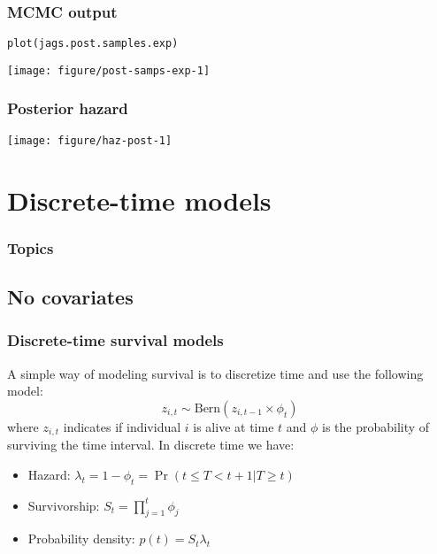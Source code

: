 \documentclass[color=usenames,dvipsnames]{beamer}\usepackage[]{graphicx}\usepackage[]{color}
\makeatletter
\newcommand{\hlstd}[1]{\textcolor[rgb]{0,0,0}{#1}}%
\newcommand{\hlkwd}[1]{\textcolor[rgb]{0.004,0.004,0.506}{#1}}%
\newenvironment{kframe}{%
 \def\at@end@of@kframe{}%
 \ifinner\ifhmode%
  \def\at@end@of@kframe{\end{minipage}}%
  \begin{minipage}{\columnwidth}%
 \fi\fi%
 \def\FrameCommand##1{\hskip\@totalleftmargin \hskip-\fboxsep
 \colorbox{shadecolor}{##1}\hskip-\fboxsep
     \hskip-\linewidth \hskip-\@totalleftmargin \hskip\columnwidth}%
 \MakeFramed {\advance\hsize-\width
   \@totalleftmargin\z@ \linewidth\hsize
   \@setminipage}}%
 {\par\unskip\endMakeFramed%
 \at@end@of@kframe}
\newenvironment{knitrout}{}{} %
\makeatother
\begin{document}
\begin{frame}[fragile]
  \frametitle{MCMC output}
\begin{knitrout}
\color{fgcolor}\begin{kframe}
\begin{alltt}
\hlkwd{plot}\hlstd{(jags.post.samples.exp)}
\end{alltt}
\end{kframe}

{\centering \texttt{[image: figure/post-samps-exp-1]} 

}


\end{knitrout}
\end{frame}


\begin{frame}[fragile]
  \frametitle{Posterior hazard}
\begin{knitrout}
\color{fgcolor}

{\centering \texttt{[image: figure/haz-post-1]} 

}


\end{knitrout}
\end{frame}



\section{Discrete-time models}



\begin{frame}[plain]
  \frametitle{Topics}
  \Large
  \tableofcontents[currentsection]
\end{frame}

\subsection{No covariates}


\begin{frame}
  \frametitle{Discrete-time survival models}
  A simple way of modeling survival is to discretize time and use the
  following model:
  \[
    z_{i,t} \sim \mathrm{Bern}(z_{i,t-1}\times \phi_t)
  \]
  where $z_{i,t}$ indicates if individual $i$ is alive at time $t$ and
  $\phi$ is the probability of surviving the time interval.
  \pause
  \vfill
  In discrete time we have:
  \begin{itemize}
    \item Hazard: $\lambda_t = 1-\phi_t = \Pr(t \le T < t+1 | T\ge t)$
    \item Survivorship: $S_t = \prod_{j=1}^t \phi_j$
    \item Probability density: $p(t) = S_t \lambda_t$
  \end{itemize}
\end{frame}
\end{document}
